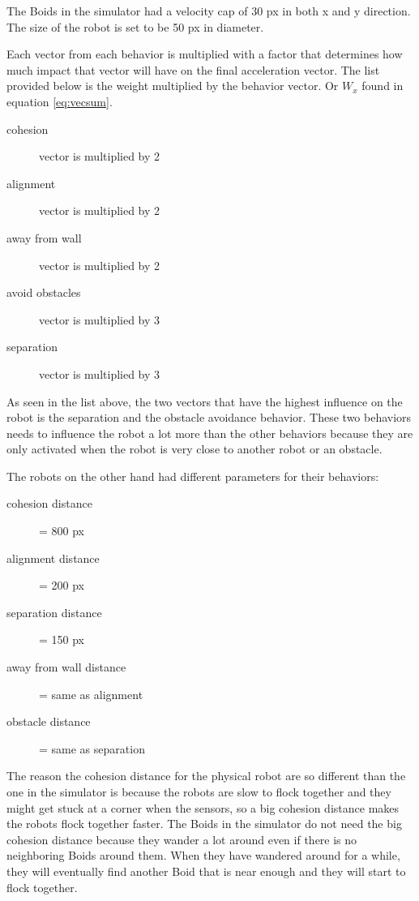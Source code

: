 The Boids in the simulator had a velocity cap of 30 px in both x and y direction. 
The size of the robot is set to be 50 px in diameter.

Each vector from each behavior is multiplied with a factor that determines how much impact that vector will have on the final acceleration vector.
The list provided below is the weight multiplied by the behavior vector. Or $W_x$ found in equation \ref{eq:vecsum}.
\begin{description}
\item[cohesion] vector is multiplied by 2
\item[alignment] vector is multiplied by 2
\item[away from wall] vector is multiplied by 2
\item[avoid obstacles] vector is multiplied by 3
\item[separation] vector is multiplied by 3
\end{description}

As seen in the list above, the two vectors that have the highest influence on the robot is the separation and the obstacle avoidance behavior. These two behaviors needs to influence the robot a lot more than the other behaviors because they are only activated when the robot is very close to another robot or an obstacle.

The robots on the other hand had different parameters for their behaviors:
\begin{description}
\item[cohesion distance] = 800 px
\item[alignment distance] = 200 px
\item[separation distance] = 150 px
\item[away from wall distance] = same as alignment
\item[obstacle distance] = same as separation
\end{description}

The reason the cohesion distance for the physical robot are so different than the one in the simulator is because the robots are slow to flock together and they might get stuck at a corner when the sensors, so a big cohesion distance makes the robots flock together faster. The Boids in the simulator do not need the big cohesion distance because they wander a lot around even if there is no neighboring Boids around them. When they have wandered around for a while, they will eventually find another Boid that is near enough and they will start to flock together.

